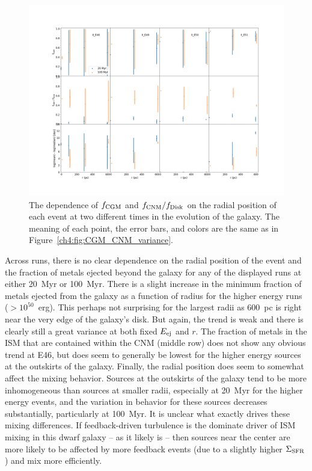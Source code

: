  \begin{figure}
   \centering
   \includegraphics[width=0.95\linewidth]{figures/ch4/II_radial_dependence}
   \caption{The dependence of $f_{\rm CGM}$ and $f_{\rm CNM} / f_{\rm Disk}$ on the radial position of each event at two different times in the evolution of the galaxy. The meaning of each point, the error bars, and colors are the same as in Figure~\ref{ch4:fig:CGM_CNM_variance}.}
   \label{ch4:fig:radial position}
 \end{figure}

Across runs, there is no clear dependence on the radial position of the event and the fraction of metals ejected beyond the galaxy for any of the displayed runs at either 20~Myr or 100~Myr. There is a slight increase in the minimum fraction of metals ejected from the galaxy as a function of radius for the higher energy runs ($>10^{50}$~erg). This perhaps not surprising for the largest radii as 600~pc is right near the very edge of the galaxy's disk. But again, the trend is weak and there is clearly still a great variance at both fixed $E_{\rm ej}$ and $r$. The fraction of metals in the ISM that are contained within the CNM (middle row) does not show any obvious trend at E46, but does seem to generally be lowest for the higher energy sources at the outskirts of the galaxy. Finally, the radial position does seem to somewhat affect the mixing behavior. Sources at the outskirts of the galaxy tend to be more inhomogeneous than sources at smaller radii, especially at 20~Myr for the higher energy events, and the variation in behavior for these sources decreases substantially, particularly at 100~Myr. It is unclear what exactly drives these mixing differences. If feedback-driven turbulence is the dominate driver of ISM mixing in this dwarf galaxy -- as it likely is -- then sources near the center are more likely to be affected by more feedback events (due to a slightly higher $\Sigma_{\rm SFR}$) and mix more efficiently.

